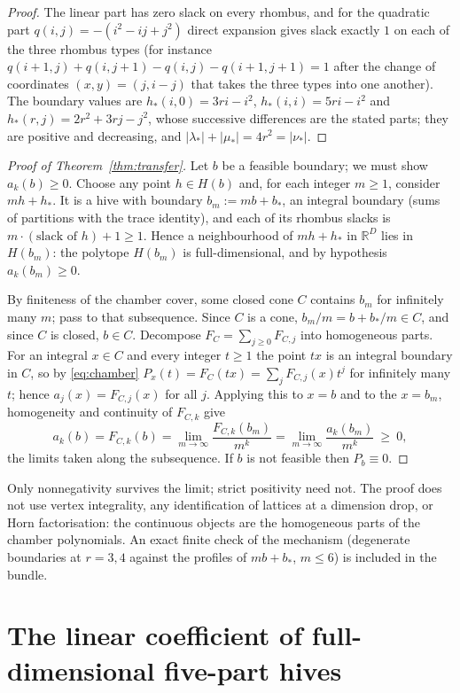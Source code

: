 \documentclass[11pt]{amsart}
\theoremstyle{definition}
\newcommand{\R}{\mathbb{R}}
\newcommand{\lam}{\lambda}
\begin{document}
\begin{proof}
The linear part has zero slack on every rhombus, and for the quadratic part
$q(i,j)=-(i^2-ij+j^2)$ direct expansion gives slack exactly $1$ on each of the
three rhombus types (for instance
$q(i+1,j)+q(i,j+1)-q(i,j)-q(i+1,j+1)=1$ after the change of coordinates
$(x,y)=(j,i-j)$ that takes the three types into one another). The boundary
values are $h_*(i,0)=3ri-i^2$, $h_*(i,i)=5ri-i^2$ and
$h_*(r,j)=2r^2+3rj-j^2$, whose successive differences are the stated parts;
they are positive and decreasing, and $|\lam_*|+|\mu_*|=4r^2=|\nu_*|$.
\end{proof}

\begin{proof}[Proof of Theorem~\ref{thm:transfer}]
Let $b$ be a feasible boundary; we must show $a_k(b)\ge0$. Choose any point
$h\in H(b)$ and, for each integer $m\ge1$, consider $mh+h_*$. It is a hive with
boundary $b_m:=mb+b_*$, an integral boundary (sums of partitions with the trace
identity), and each of its rhombus slacks is $m\cdot(\text{slack of }h)+1\ge1$.
Hence a neighbourhood of $mh+h_*$ in $\R^{D}$ lies in $H(b_m)$: the polytope
$H(b_m)$ is full-dimensional, and by hypothesis $a_k(b_m)\ge0$.

By finiteness of the chamber cover, some closed cone $C$ contains $b_m$ for
infinitely many $m$; pass to that subsequence. Since $C$ is a cone,
$b_m/m=b+b_*/m\in C$, and since $C$ is closed, $b\in C$. Decompose
$F_C=\sum_{j\ge0}F_{C,j}$ into homogeneous parts. For an integral $x\in C$ and
every integer $t\ge1$ the point $tx$ is an integral boundary in $C$, so by
\eqref{eq:chamber} $P_x(t)=F_C(tx)=\sum_j F_{C,j}(x)t^{j}$ for infinitely many
$t$; hence $a_j(x)=F_{C,j}(x)$ for all $j$. Applying this to $x=b$ and to the
$x=b_m$, homogeneity and continuity of $F_{C,k}$ give
\[
  a_k(b)=F_{C,k}(b)=\lim_{m\to\infty}\frac{F_{C,k}(b_m)}{m^{k}}
  =\lim_{m\to\infty}\frac{a_k(b_m)}{m^{k}}\ \ge\ 0,
\]
the limits taken along the subsequence. If $b$ is not feasible then
$P_b\equiv0$.
\end{proof}

Only nonnegativity survives the limit; strict positivity need not. The proof
does not use vertex integrality, any identification of lattices at a dimension
drop, or Horn factorisation: the continuous objects are the homogeneous parts
of the chamber polynomials. An exact finite check of the mechanism (degenerate
boundaries at $r=3,4$ against the profiles of $mb+b_*$, $m\le 6$) is included in
the bundle.

\section{The linear coefficient of full-dimensional five-part hives}
\label{sec:linear}
\end{document}
